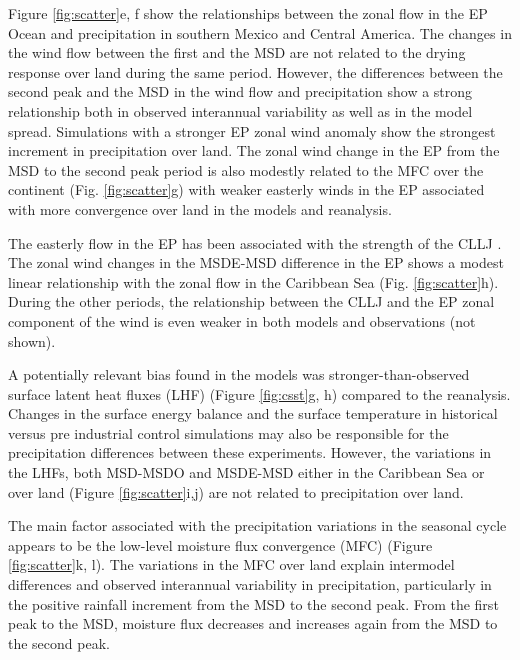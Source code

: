 Figure \ref{fig:scatter}e, f show the relationships between the zonal flow in the EP Ocean and precipitation in southern Mexico and Central America. 
The changes in the wind flow between the first and the MSD are not related to the drying response over land during the same period. 
However, the differences between the second peak and the MSD in the wind flow and precipitation show a strong relationship both in observed interannual variability as well as in the model spread. Simulations with a stronger EP zonal wind anomaly show the strongest increment in precipitation over land.
The zonal wind change in the EP from the MSD to the second peak period is also modestly related to the MFC over the continent (Fig. \ref{fig:scatter}g) with weaker easterly winds in the EP associated with more convergence over land in the models and reanalysis. 


The easterly flow in the EP has been associated with the strength of the CLLJ \citep{herrera2015}. The zonal wind changes in the MSDE-MSD difference in the EP shows a modest linear relationship with the zonal flow in the Caribbean Sea (Fig. \ref{fig:scatter}h). During the other periods, the relationship between the CLLJ and the EP zonal component of the wind is even weaker in both models and observations (not shown). 

 
A potentially relevant bias found in the models was stronger-than-observed surface latent heat fluxes (LHF) (Figure \ref{fig:csst}g, h) compared to the reanalysis.  Changes in the surface energy balance and the surface temperature in historical versus pre industrial control simulations may also be responsible for the precipitation differences between these experiments.  However, the variations in the LHFs, both MSD-MSDO and MSDE-MSD either in the Caribbean Sea or over land (Figure \ref{fig:scatter}i,j) are not related to precipitation over land.



The main factor associated with the precipitation variations in the seasonal cycle appears to be the low-level moisture flux convergence (MFC) (Figure \ref{fig:scatter}k, l). The variations in the MFC over land explain intermodel differences and observed interannual variability in precipitation, particularly in the positive rainfall increment from the MSD to the second peak. From the first peak to the MSD, moisture flux decreases and increases again from the MSD to the second peak. %
 
